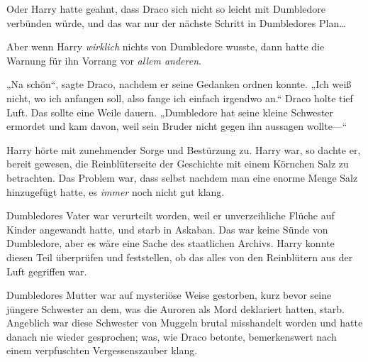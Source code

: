 Oder Harry hatte geahnt, dass Draco sich nicht so leicht mit Dumbledore verbünden würde, und das war nur der nächste Schritt in Dumbledores Plan…

Aber wenn Harry \emph{wirklich} nichts von Dumbledore wusste, dann hatte die Warnung für ihn Vorrang vor \emph{allem anderen}.

„Na schön“, sagte Draco, nachdem er seine Gedanken ordnen konnte. „Ich weiß nicht, wo ich anfangen soll, also fange ich einfach irgendwo an.“ Draco holte tief Luft. Das sollte eine Weile dauern. „Dumbledore hat seine kleine Schwester ermordet und kam davon, weil sein Bruder nicht gegen ihn aussagen wollte—“

\later

Harry hörte mit zunehmender Sorge und Bestürzung zu. Harry war, so dachte er, bereit gewesen, die Reinblüterseite der Geschichte mit einem Körnchen Salz zu betrachten. Das Problem war, dass selbst nachdem man eine enorme Menge Salz hinzugefügt hatte, es \emph{immer} noch nicht gut klang.

Dumbledores Vater war verurteilt worden, weil er unverzeihliche Flüche auf Kinder angewandt hatte, und starb in Askaban. Das war keine Sünde von Dumbledore, aber es wäre eine Sache des staatlichen Archivs. Harry konnte diesen Teil überprüfen und feststellen, ob das alles von den Reinblütern aus der Luft gegriffen war.

Dumbledores Mutter war auf mysteriöse Weise gestorben, kurz bevor seine jüngere Schwester an dem, was die Auroren als Mord deklariert hatten, starb. Angeblich war diese Schwester von Muggeln brutal misshandelt worden und hatte danach nie wieder gesprochen; was, wie Draco betonte, bemerkenswert nach einem verpfuschten Vergessenszauber klang.

